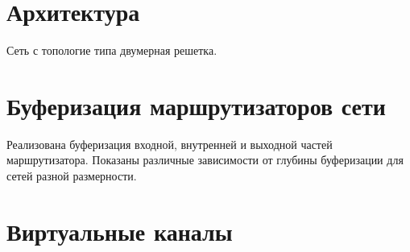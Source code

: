 \section{Архитектура}

Сеть с топологие типа двумерная решетка.

\section{Буферизация маршрутизаторов сети}

Реализована буферизация входной, внутренней и выходной частей маршрутизатора. Показаны различные зависимости от глубины буферизации для сетей разной размерности.

\section{Виртуальные каналы}

\clearpage

